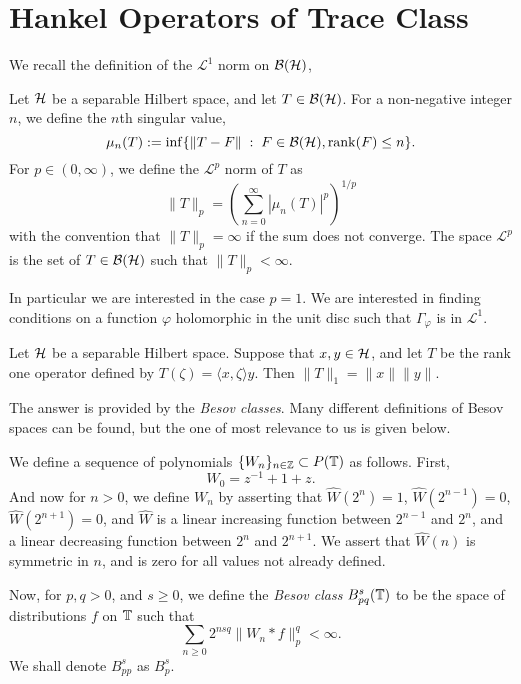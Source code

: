 \section{Hankel Operators of Trace Class}
We recall the definition of the $\mathcal{L}^1$ norm on $\mathcal{B}(\mathcal{H})$,
\begin{definition}
    Let $\mathcal{H}$ be a separable Hilbert space, and let $T \in \mathcal{B}(\mathcal{H})$. 
    For a non-negative integer $n$, we define the $n$th singular value,
    \begin{equation*}
        \mu_n(T) := \inf\{\|T-F\| \;:\;F \in \mathcal{B}(\mathcal{H}),\operatorname{rank}(F) \leq n\}.
    \end{equation*}
    For $p \in (0,\infty)$, we define the $\mathcal{L}^p$ norm of $T$
    as
    \begin{equation*}
        \|T\|_p = \left(\sum_{n=0}^\infty |\mu_n(T)|^p\right)^{1/p}
    \end{equation*}
    with the convention that $\|T\|_p = \infty$ if the sum does not
    converge. The space $\mathcal{L}^p$ is the set of $T \in \mathcal{B}(\mathcal{H})$
    such that $\|T\|_p < \infty$.
\end{definition}



In particular we are interested in the case $p = 1$. We are interested
in finding conditions on a function $\varphi$ holomorphic in the unit disc
such that $\Gamma_\varphi$ is in $\mathcal{L}^1$. 

\begin{lemma}
    Let $\mathcal{H}$ be a separable Hilbert space. Suppose
    that $x,y \in \mathcal{H}$, and let $T$ be the rank one operator
    defined by $T(\zeta) = \langle x,\zeta\rangle y$. Then $\|T\|_1 = \|x\|\|y\|$.
\end{lemma}

The answer is provided by the \emph{Besov classes}. Many different definitions
of Besov spaces can be found, but the one of most relevance to us is given below.
\begin{definition}
    \label{besovDefinition}
    We define a sequence of polynomials $\{W_n\}_{n \in \mathbb{Z}} \subset P(\mathbb{T})$ as follows.
    First,
    \begin{equation*}
        W_0 = z^{-1}+1+z.
    \end{equation*}
    And now for $n > 0$, we define $W_n$ by asserting that $\widehat{W}(2^n) = 1$,
    $\widehat{W}(2^{n-1}) = 0$, $\widehat{W}(2^{n+1}) = 0$, and $\widehat{W}$
    is a linear increasing function between $2^{n-1}$ and $2^n$, and a
    linear decreasing function between $2^n$ and $2^{n+1}$. We
    assert that $\widehat{W}(n)$ is symmetric in $n$, and is zero for all
    values not already defined.
    
    Now, for $p,q > 0$, and $s \geq 0$, we define the \emph{Besov class}
    $B_{pq}^s(\mathbb{T})$ to be the space of distributions $f$ on $\mathbb{T}$ such that
    \begin{equation*}
        \sum_{n\geq 0} 2^{nsq} \|W_n*f\|_{p}^q < \infty.
    \end{equation*}  
    We shall denote $B_{pp}^s$ as $B_p^s$.
\end{definition}

